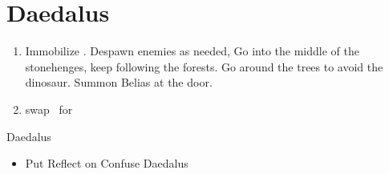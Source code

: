 \chapter{Daedalus}

\begin{enumerate}
	\item Immobilize \penelo. Despawn enemies as needed, Go into the middle of the stonehenges, keep following the forests. Go around the trees to avoid the dinosaur. Summon Belias at the door.
	\item swap \vaan\ for \balthier
\end{enumerate}
\begin{gambit}
	\begin{itemize}
	\end{itemize}
\end{gambit}
\begin{battle}{Daedalus}
	\begin{itemize}
		\item Put Reflect on \balthier
		      \balthierf Confuse Daedalus
	\end{itemize}
\end{battle}